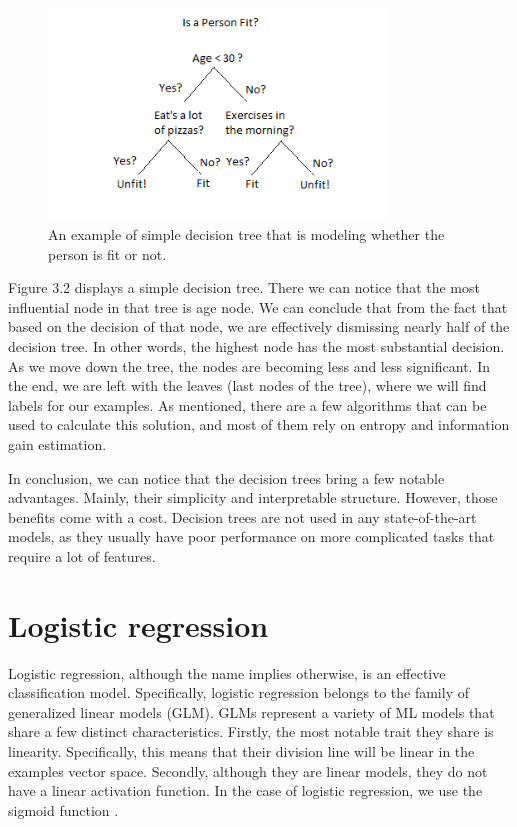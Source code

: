 \documentclass[times, utf8, seminar]{fer}
\begin{document}
\begin{figure}[h]
	\centering
	\includegraphics[width=9cm]{decision-tree}
	\caption{An example of simple decision tree that is modeling whether the person is fit or not.  \protect \footnotemark}
\end{figure}


Figure 3.2 displays a simple decision tree. There we can notice that the most influential node in that tree is age node. We can conclude that from the fact that based on the decision of that node, we are effectively dismissing nearly half of the decision tree. In other words, the highest node has the most substantial decision. As we move down the tree, the nodes are becoming less and less significant. In the end, we are left with the leaves (last nodes of the tree), where we will find labels for our examples. As mentioned, there are a few algorithms that can be used to calculate this solution, and most of them rely on entropy and information gain estimation.

In conclusion, we can notice that the decision trees bring a few notable advantages. Mainly, their simplicity and interpretable structure. However, those benefits come with a cost. Decision trees are not used in any state-of-the-art models, as they usually have poor performance on more complicated tasks that require a lot of features.

\newpage

\section{Logistic regression}

Logistic regression, although the name implies otherwise, is an effective classification model. Specifically, logistic regression belongs to the family of generalized linear models (GLM). GLMs represent a variety of ML models that share a few distinct characteristics.  Firstly, the most notable trait they share is linearity. Specifically, this means that their division line will be linear in the examples vector space. Secondly, although they are linear models, they do not have a linear activation function. In the case of logistic regression, we use the sigmoid function \citep{logistic}.
\end{document}
